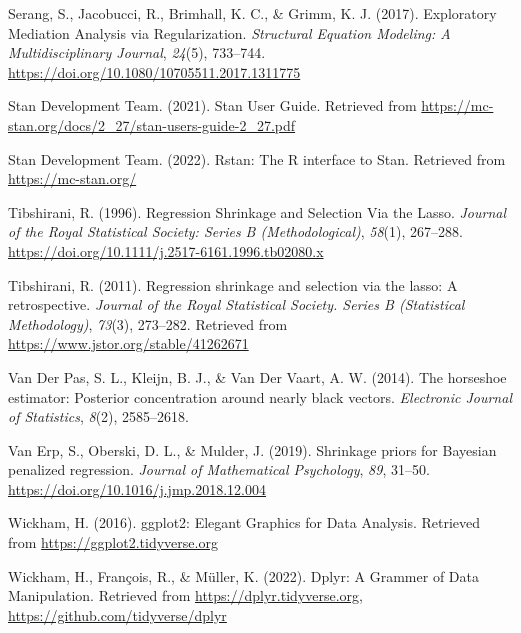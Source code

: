 \documentclass[
  man, donotrepeattitle,floatsintext]{apa6}
\newlength{\cslhangindent}
\newlength{\cslentryspacingunit} %
\newenvironment{CSLReferences}[2] %
 {%
  \setlength{\parindent}{0pt}
  \ifodd #1
  \let\oldpar\par
  \def\par{\hangindent=\cslhangindent\oldpar}
  \fi
  \setlength{\parskip}{#2\cslentryspacingunit}
 }%
 {}
\begin{document}
\begin{CSLReferences}{1}{0}
\leavevmode{}%
Serang, S., Jacobucci, R., Brimhall, K. C., \& Grimm, K. J. (2017). Exploratory {Mediation} {Analysis} via {Regularization}. \emph{Structural Equation Modeling: A Multidisciplinary Journal}, \emph{24}(5), 733--744. \url{https://doi.org/10.1080/10705511.2017.1311775}

\leavevmode{}%
Stan Development Team. (2021). Stan {User} {Guide}. Retrieved from \url{https://mc-stan.org/docs/2_27/stan-users-guide-2_27.pdf}

\leavevmode{}%
Stan Development Team. (2022). Rstan: The {R} interface to {Stan}. Retrieved from \url{https://mc-stan.org/}

\leavevmode{}%
Tibshirani, R. (1996). Regression {Shrinkage} and {Selection} {Via} the {Lasso}. \emph{Journal of the Royal Statistical Society: Series B (Methodological)}, \emph{58}(1), 267--288. \url{https://doi.org/10.1111/j.2517-6161.1996.tb02080.x}

\leavevmode{}%
Tibshirani, R. (2011). Regression shrinkage and selection via the lasso: A retrospective. \emph{Journal of the Royal Statistical Society. Series B (Statistical Methodology)}, \emph{73}(3), 273--282. Retrieved from \url{https://www.jstor.org/stable/41262671}

\leavevmode{}%
Van Der Pas, S. L., Kleijn, B. J., \& Van Der Vaart, A. W. (2014). The horseshoe estimator: {Posterior} concentration around nearly black vectors. \emph{Electronic Journal of Statistics}, \emph{8}(2), 2585--2618.

\leavevmode{}%
Van Erp, S., Oberski, D. L., \& Mulder, J. (2019). Shrinkage priors for {Bayesian} penalized regression. \emph{Journal of Mathematical Psychology}, \emph{89}, 31--50. \url{https://doi.org/10.1016/j.jmp.2018.12.004}

\leavevmode{}%
Wickham, H. (2016). ggplot2: {Elegant} {Graphics} for {Data} {Analysis}. Retrieved from \url{https://ggplot2.tidyverse.org}

\leavevmode{}%
Wickham, H., François, R., \& Müller, K. (2022). Dplyr: {A} {Grammer} of {Data} {Manipulation}. Retrieved from \href{https://dplyr.tidyverse.org,\%20https://github.com/tidyverse/dplyr}{https://dplyr.tidyverse.org, https://github.com/tidyverse/dplyr}


\end{CSLReferences}
\end{document}

